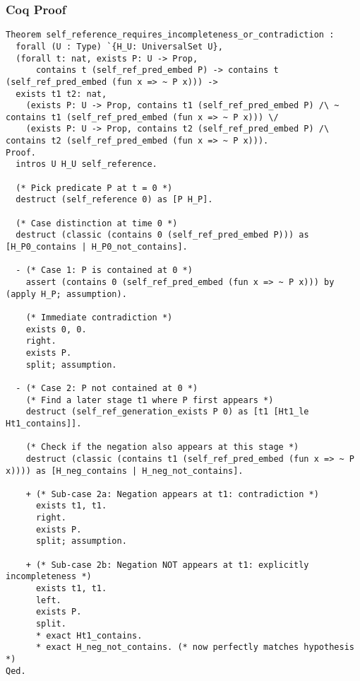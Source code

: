 \documentclass[12pt]{article}
\begin{document}
\subsubsection{Coq Proof}
\begin{lstlisting}[language=Coq]
Theorem self_reference_requires_incompleteness_or_contradiction :
  forall (U : Type) `{H_U: UniversalSet U},
  (forall t: nat, exists P: U -> Prop, 
      contains t (self_ref_pred_embed P) -> contains t (self_ref_pred_embed (fun x => ~ P x))) ->
  exists t1 t2: nat, 
    (exists P: U -> Prop, contains t1 (self_ref_pred_embed P) /\ ~ contains t1 (self_ref_pred_embed (fun x => ~ P x))) \/
    (exists P: U -> Prop, contains t2 (self_ref_pred_embed P) /\ contains t2 (self_ref_pred_embed (fun x => ~ P x))).
Proof.
  intros U H_U self_reference.

  (* Pick predicate P at t = 0 *)
  destruct (self_reference 0) as [P H_P].

  (* Case distinction at time 0 *)
  destruct (classic (contains 0 (self_ref_pred_embed P))) as [H_P0_contains | H_P0_not_contains].
  
  - (* Case 1: P is contained at 0 *)
    assert (contains 0 (self_ref_pred_embed (fun x => ~ P x))) by (apply H_P; assumption).

    (* Immediate contradiction *)
    exists 0, 0.
    right.
    exists P.
    split; assumption.

  - (* Case 2: P not contained at 0 *)
    (* Find a later stage t1 where P first appears *)
    destruct (self_ref_generation_exists P 0) as [t1 [Ht1_le Ht1_contains]].

    (* Check if the negation also appears at this stage *)
    destruct (classic (contains t1 (self_ref_pred_embed (fun x => ~ P x)))) as [H_neg_contains | H_neg_not_contains].

    + (* Sub-case 2a: Negation appears at t1: contradiction *)
      exists t1, t1.
      right.
      exists P.
      split; assumption.

    + (* Sub-case 2b: Negation NOT appears at t1: explicitly incompleteness *)
      exists t1, t1.
      left.
      exists P.
      split.
      * exact Ht1_contains.
      * exact H_neg_not_contains. (* now perfectly matches hypothesis *)
Qed.
\end{lstlisting}
\end{document}
